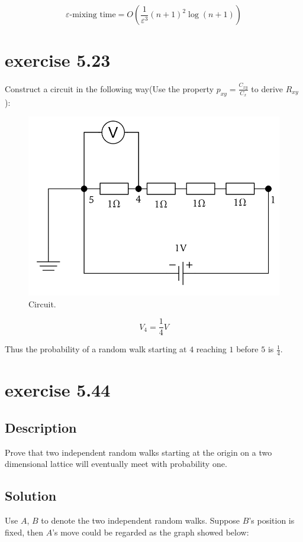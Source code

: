 \documentclass[paper=a4, fontsize=11pt]{scrartcl} %
\numberwithin{equation}{section} %
\numberwithin{figure}{section} %
\numberwithin{table}{section} %
\begin{document}
$$\varepsilon\textrm{-mixing time} = O\left(\frac{1}{\varepsilon^3}(n+1)^2\log(n+1)\right)$$
\section*{exercise 5.23}
Construct a circuit in the following way(Use the property $p_{xy} = \frac{C_{xy}}{C_x}$ to derive $R_{xy}$):

\begin{figure}[H]
	\centering
	\includegraphics[width=350pt]{circuit.png}
	\caption{Circuit.}
\end{figure}

$$V_4 = \frac{1}{4} V $$

Thus the probability of a random walk starting at $4$ reaching $1$ before $5$ is $\frac{1}{4}$. 
\section*{exercise 5.44}
\subsection*{Description}
Prove that two independent random walks starting at the origin on a two dimensional lattice will eventually meet with probability one.
\subsection*{Solution}

Use $A$, $B$ to denote the two independent random walks. Suppose $B$'s position is fixed, then $A$'s move could be regarded as the graph showed below:
\end{document}
